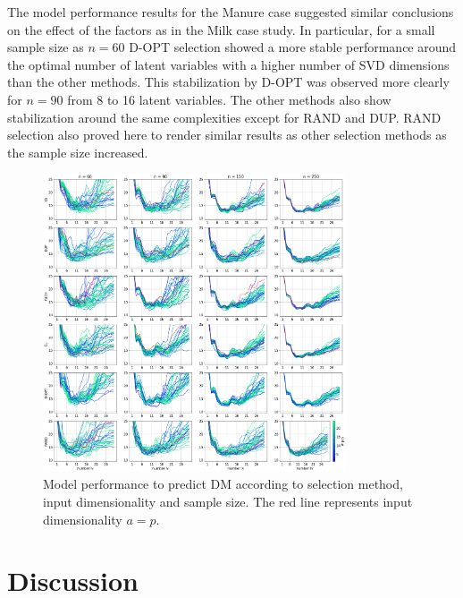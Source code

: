 \documentclass[journal=ancham,manuscript=article]{achemso}
\begin{document}
The model performance results for the Manure case suggested similar conclusions on the effect of the factors as in the Milk case study. In particular, for a small sample size as $n=60$ D-OPT selection showed a more stable performance  around the optimal number of latent variables with a higher number of SVD dimensions than the other methods. This stabilization by D-OPT was observed more clearly for $n=90$ from 8 to 16 latent variables. The other methods also show stabilization around the same complexities except for RAND and DUP. RAND selection also proved here to render similar results as other selection methods as the sample size increased.




\begin{figure}[b]
\includegraphics[width=0.8\textwidth]{manuscript/figures/d02_manure_model_performance.png}
\centering
\caption{Model performance to predict DM according to selection method, input dimensionality and sample size. The red line represents input dimensionality $a=p$.}
\label{fig_d02_manure_model_performance}
\end{figure}




\section*{Discussion}\label{discussion}
\end{document}
